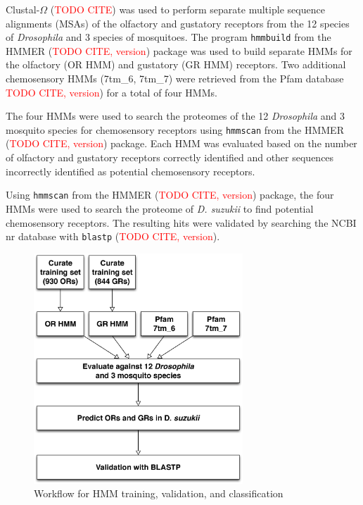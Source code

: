 Clustal-$\Omega$ (\textcolor{red}{TODO CITE}) was used to perform separate multiple sequence alignments (MSAs) of the olfactory and gustatory receptors from the 12 species of \emph{Drosophila} and 3 species of mosquitoes.  The program \texttt{hmmbuild} from the HMMER (\textcolor{red}{TODO CITE, version}) package was used to build separate HMMs for the olfactory (OR HMM) and gustatory (GR HMM) receptors.  Two additional chemosensory HMMs (7tm\_6, 7tm\_7) were retrieved from the Pfam database \textcolor{red}{TODO CITE, version}) for a total of four HMMs.

The four HMMs were used to search the proteomes of the 12 \emph{Drosophila} and 3 mosquito species for chemosensory receptors using \texttt{hmmscan} from the HMMER (\textcolor{red}{TODO CITE, version}) package.  Each HMM was evaluated based on the number of olfactory and gustatory receptors correctly identified and other sequences incorrectly identified as potential chemosensory receptors.

Using \texttt{hmmscan} from the HMMER (\textcolor{red}{TODO CITE, version}) package, the four HMMs were used to search the proteome of \emph{D. suzukii} to find potential chemosensory receptors.  The resulting hits were validated by searching the NCBI nr database with \texttt{blastp} (\textcolor{red}{TODO CITE, version}).

\begin{figure}[H]
  \centering
  \includegraphics[width=0.7\textwidth]{figures/chemosensory/hmm_workflow}
  \caption{Workflow for HMM training, validation, and classification}
  \label{fig:chemosensory:hmm-workflow}
\end{figure}

